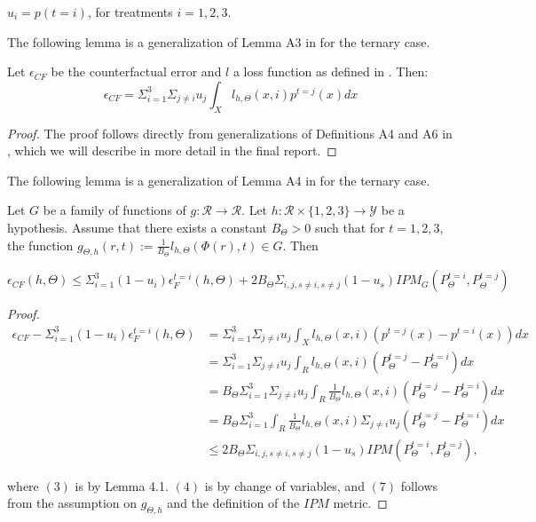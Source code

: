 \documentclass{article}
\begin{document}
\begin{definition}
$u_{i} = p(t = i)$, for treatments $i= 1, 2, 3$.
\end{definition}

The following lemma is a generalization of Lemma A3 in \cite{shalit2017estimating} for the ternary case.
\begin{lemma}
Let $\epsilon_{CF}$ be the counterfactual error and $l$ a loss function as defined in \cite{shalit2017estimating}. Then:
\[
\epsilon_{CF} = \Sigma_{i=1}^{3}\Sigma_{j \neq i}u_{j}\int_{X}l_{h, \Theta}(x, i)p^{t= j}(x)dx
\]
\end{lemma}
\begin{proof}
The proof follows directly from generalizations of Definitions A4 and A6 in \cite{shalit2017estimating}, which we will describe in more detail in the final report.
\end{proof}

The following lemma is a generalization of Lemma A4 in \cite{shalit2017estimating} for the ternary case.
\begin{lemma}
Let $G$ be a family of functions of $g : \mathcal{R} \rightarrow \mathcal{R}$. Let $h: \mathcal{R} \times \{1, 2, 3\} \rightarrow\mathcal{Y}$ be a hypothesis. Assume that there exists a constant $B_{\Theta} > 0$ such that for $t = 1, 2, 3$, the function $g_{\Theta, h}(r, t) := \frac{1}{B_{\Theta}}l_{h, \Theta}(\Phi(r), t) \in G$. Then 

\[
\epsilon_{CF}(h, \Theta) \leq \Sigma_{i = 1}^{3}(1 - u_{i})\epsilon_{F}^{t=i}(h, \Theta) + 2B_{\Theta}\Sigma_{i, j, s \neq i, s\neq j}(1-u_{s})IPM_{G}(P_{\Theta}^{t = i}, P_{\Theta}^{t= j})
\]
\end{lemma}

\begin{proof} 
\begin{align}
    \epsilon_{CF} - \Sigma_{i=1}^{3}(1-u_{i})\epsilon_{F}^{t=i}(h, \Theta)
    &= \Sigma_{i = 1}^{3}\Sigma_{j\neq i}u_{j}\int_{X}l_{h, \Theta}(x, i)(p^{t=j}(x) - p^{t = i}(x))dx \\
    &= \Sigma_{i=1}^{3}\Sigma_{j\neq i}u_{j}\int_{R}l_{h, \Theta}(x, i)(P_{\Theta}^{t = j} - P_{\Theta}^{t = i})dx \\
    &= B_{\Theta}\Sigma_{i=1}^{3}\Sigma_{j\neq i}u_{j}\int_{R}\frac{1}{B_{\Theta}}l_{h, \Theta}(x, i)(P_{\Theta}^{t = j} - P_{\Theta}^{t = i})dx \\
    &= B_{\Theta} \Sigma_{i=1}^{3}\int_{R}\frac{1}{B_{\Theta}}l_{h, \Theta}(x, i)\Sigma_{j\neq i}u_{j}(P_{\Theta}^{t = j} - P_{\Theta}^{t = i})dx \\
    &\leq 
    2B_{\Theta}\Sigma_{i, j, s\neq i, s\neq j}(1-u_{s})IPM(P_{\Theta}^{t=i}, P_{\Theta}^{t= j}),
\end{align}

where $(3)$ is by Lemma 4.1. $(4)$ is by change of variables, and $(7)$ follows from the assumption on $g_{\Theta, h}$ and the definition of the $IPM$ metric.
\end{proof}
\end{document}

